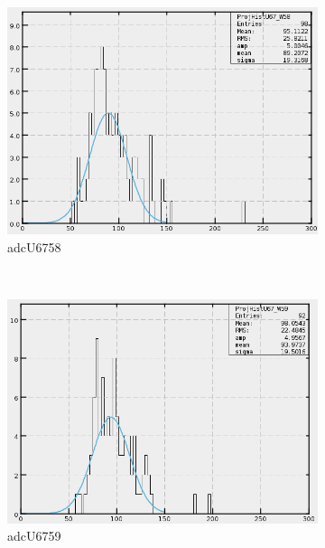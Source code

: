 \begin{figure}[h]
\begin{subfigure}[h]{0.3\textwidth}
        \includegraphics[width=\textwidth, keepaspectratio = true]{adcU67_58}
        \caption{adcU6758}
        \label{fig:adcU67_58}
    \end{subfigure}
    \\
    \begin{subfigure}[h]{0.3\textwidth}
        \centering
        \includegraphics[width=\textwidth, keepaspectratio = true]{adcU67_59}
        \caption{adcU6759}
        \label{fig:adcU67_59}
    \end{subfigure}
    ~
    \begin{subfigure}[h]{0.3\textwidth}
        \centering

\end{subfigure}
\end{figure}

